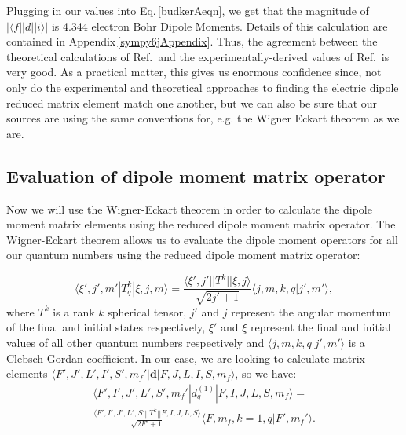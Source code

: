 Plugging in our values into Eq.\,\ref{budkerAeqn}, we get that the magnitude of $|\langle f ||d|| i \rangle|$ is 4.344 electron Bohr Dipole Moments. Details of this calculation are contained in Appendix\,\ref{sympy6jAppendix}.
 Thus, the agreement between the theoretical calculations of Ref.\,\cite{safronova2photon} and the experimentally-derived values of Ref.\,\cite{NISTasd} is very good. As a practical matter, this gives us enormous confidence since, not only do the experimental and theoretical approaches to finding the electric dipole reduced matrix element match one another, but we can also be sure that our sources are using the same conventions for, e.g. the Wigner Eckart theorem as we are.

\subsection{Evaluation of dipole moment matrix operator}

Now we will use the Wigner-Eckart theorem in order to calculate the dipole moment matrix elements using the reduced dipole moment matrix operator. The Wigner-Eckart theorem allows us to evaluate the dipole moment operators for all our quantum numbers using the reduced dipole moment matrix operator:

\begin{equation}\label{wignerEckart}
\langle \xi',j',m'|T^k_q|\xi,j,m\rangle = \frac{\langle \xi',j'||T^k||\xi,j\rangle}{\sqrt{2j'+1}}\langle j,m,k,q|j',m'\rangle,
\end{equation}
where $T^k$ is a rank $k$ spherical tensor, $j'$ and $j$ represent the angular momentum of the final and initial states respectively, $\xi'$ and $\xi$ represent the final and initial values of all other quantum numbers respectively and $\langle j,m,k,q|j',m'\rangle$ is a Clebsch Gordan coefficient. In our case, we are looking to calculate matrix elements  $\langle F',J',L',I',S',m_f'|\mathbf{d}|F,J,L,I,S,m_f\rangle$, so we have:
\begin{multline}\label{wignerEckartForUs}
\langle F',I',J',L',S',m_f'|d^{(1)}_q|F,I,J,L,S,m_f\rangle =
\\ \frac{\langle F',I',J',L',S'||T^k||F,I,J,L,S\rangle}{\sqrt{2F'+1}}\langle F,m_f,k=1,q|F',m_f'\rangle.
\end{multline}


